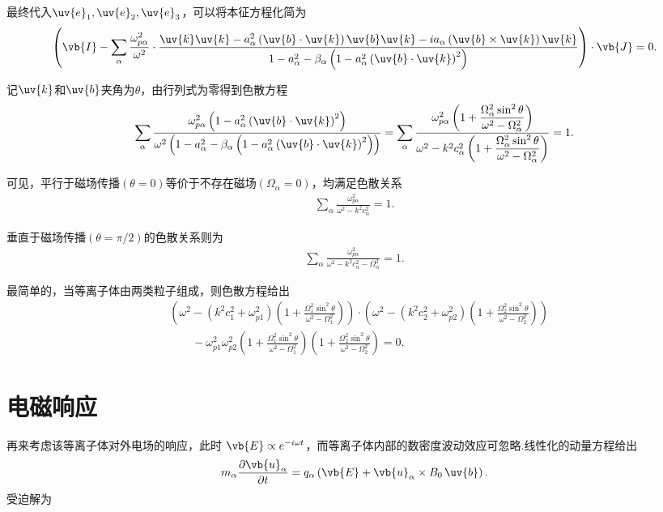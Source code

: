 最终代入\(\uv{e}_1, \uv{e}_2, \uv{e}_3\)，可以将本征方程化简为
\begin{align*}
	\left( \vb{I} - \sum_\alpha \frac{\omega_{p\alpha}^2}{\omega^2}\cdot\frac{\uv{k}\uv{k} - a_\alpha^2\left( \uv{b}\cdot\uv{k} \right)\uv{b}\uv{k} - i a_\alpha\left( \uv{b}\times\uv{k} \right)\uv{k}}{1 - a_\alpha^2 - \beta_\alpha\left(1 - a_\alpha^2\left( \uv{b}\cdot\uv{k} \right)^2\right)} \right)\cdot\vb{J} = 0.
\end{align*}

记\(\uv{k}\)和\(\uv{b}\)夹角为\(\theta\)，由行列式为零得到色散方程
\begin{align*}
	\sum_\alpha \frac{\omega_{p\alpha}^2\left(1 - a_\alpha^2\left( \uv{b}\cdot\uv{k} \right)^2\right)}{\omega^2\left(1 - a_\alpha^2 - \beta_\alpha\left(1 - a_\alpha^2\left( \uv{b}\cdot\uv{k} \right)^2\right)\right)}=
	\sum_\alpha \dfrac{\omega_{p\alpha}^2\left(1 + \dfrac{\Omega_\alpha^2\sin^2\theta}{\omega^2 - \Omega_\alpha^2}\right)}{\omega^2 - k^2 c_\alpha^2\left(1 + \dfrac{\Omega_\alpha^2\sin^2\theta}{\omega^2 - \Omega_\alpha^2}\right)} = 1.
\end{align*}

可见，平行于磁场传播\((\theta = 0)\)等价于不存在磁场\((\Omega_\alpha = 0)\)，均满足色散关系
\begin{align*}
	\sum_\alpha \frac{\omega_{p\alpha}^2}{\omega^2 - k^2 c_\alpha^2} = 1.
\end{align*}

垂直于磁场传播\((\theta = \pi/2)\)的色散关系则为
\begin{align*}
	\sum_\alpha \frac{\omega_{p\alpha}^2}{\omega^2 - k^2 c_\alpha^2 - \Omega_\alpha^2} = 1.
\end{align*}

最简单的，当等离子体由两类粒子组成，则色散方程给出
\begin{align*}
	&\left( \omega^2 - \left(k^2 c_1^2 + \omega_{p1}^2\right)\left(1 + \frac{\Omega_1^2\sin^2\theta}{\omega^2 - \Omega_1^2}\right) \right)\cdot\left( \omega^2 - \left(k^2 c_2^2 + \omega_{p2}^2\right)\left(1 + \frac{\Omega_2^2\sin^2\theta}{\omega^2 - \Omega_2^2}\right) \right)\\&\qquad- \omega_{p1}^2 \omega_{p2}^2 \left(1 + \frac{\Omega_1^2\sin^2\theta}{\omega^2 - \Omega_1^2}\right)\left(1 + \frac{\Omega_2^2\sin^2\theta}{\omega^2 - \Omega_2^2}\right) = 0.
\end{align*}

\section{电磁响应}
再来考虑该等离子体对外电场的响应，此时 \(\vb{E}\propto e^{-i\omega t}\)，而等离子体内部的数密度波动效应可忽略.线性化的动量方程给出
\begin{align*}
	m_\alpha \frac{\partial \vb{u}_\alpha}{\partial t} = q_\alpha \left( \vb{E} + \vb{u}_\alpha\times B_0\, \uv{b} \right).
\end{align*}
受迫解为

